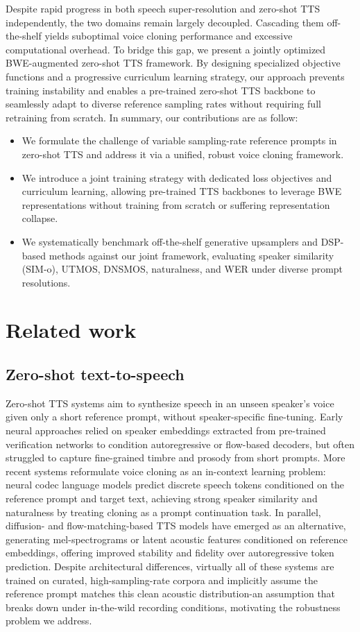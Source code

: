\documentclass{article}
\begin{document}
Despite rapid progress in both speech super-resolution and zero-shot TTS independently, the two domains remain largely decoupled. Cascading them off-the-shelf yields suboptimal voice cloning performance and excessive computational overhead. To bridge this gap, we present a jointly optimized BWE-augmented zero-shot TTS framework. By designing specialized objective functions and a progressive curriculum learning strategy, our approach prevents training instability and enables a pre-trained zero-shot TTS backbone to seamlessly adapt to diverse reference sampling rates without requiring full retraining from scratch. In summary, our contributions are as follow:
\begin{itemize}
  \item We formulate the challenge of variable sampling-rate reference prompts in zero-shot TTS and address it via a unified, robust voice cloning framework.
  \item We introduce a joint training strategy with dedicated loss objectives and curriculum learning, allowing pre-trained TTS backbones to leverage BWE representations without training from scratch or suffering representation collapse.
  \item We systematically benchmark off-the-shelf generative upsamplers and DSP-based methods against our joint framework, evaluating speaker similarity (SIM-o), UTMOS, DNSMOS, naturalness, and WER under diverse prompt resolutions.
\end{itemize}

\section{Related work}
\label{sec:related}

\subsection{Zero-shot text-to-speech}
Zero-shot TTS systems aim to synthesize speech in an unseen speaker's voice given only a short reference prompt, without speaker-specific fine-tuning. Early neural approaches relied on speaker embeddings extracted from pre-trained verification networks to condition autoregressive or flow-based decoders, but often struggled to capture fine-grained timbre and prosody from short prompts. More recent systems reformulate voice cloning as an in-context learning problem: neural codec language models \cite{valle,qwen3omni,qwen35omni} predict discrete speech tokens conditioned on the reference prompt and target text, achieving strong speaker similarity and naturalness by treating cloning as a prompt continuation task. In parallel, diffusion- and flow-matching-based TTS models \cite{voicebox,f5tts,zipvoice} have emerged as an alternative, generating mel-spectrograms or latent acoustic features conditioned on reference embeddings, offering improved stability and fidelity over autoregressive token prediction. Despite architectural differences, virtually all of these systems are trained on curated, high-sampling-rate corpora and implicitly assume the reference prompt matches this clean acoustic distribution-an assumption that breaks down under in-the-wild recording conditions, motivating the robustness problem we address.
\end{document}
